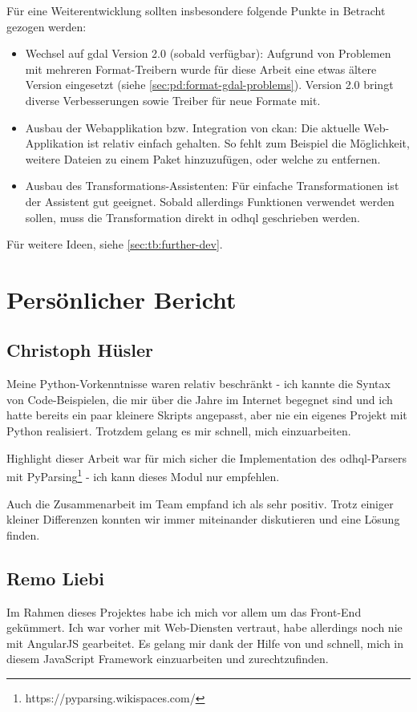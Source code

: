 Für eine Weiterentwicklung sollten insbesondere folgende Punkte in Betracht gezogen werden:

\begin{itemize}
\item Wechsel auf \acs{gdal} Version 2.0 (sobald verfügbar): Aufgrund von Problemen mit mehreren Format-Treibern wurde für diese Arbeit eine etwas ältere Version eingesetzt (siehe \vref{sec:pd:format-gdal-problems}). Version 2.0 bringt diverse Verbesserungen sowie Treiber für neue Formate mit.
\item Ausbau der Webapplikation bzw. Integration von \gls{ckan}: Die aktuelle Web-Applikation ist relativ einfach gehalten. So fehlt zum Beispiel die Möglichkeit, weitere Dateien zu einem Paket hinzuzufügen, oder welche zu entfernen.
\item Ausbau des Transformations-Assistenten: Für einfache Transformationen ist der Assistent gut geeignet. Sobald allerdings Funktionen verwendet werden sollen, muss die Transformation direkt in \acs{odhql} geschrieben werden.
\end{itemize}

Für weitere Ideen, siehe \vref{sec:tb:further-dev}.

\section{Persönlicher Bericht}

\subsection{Christoph Hüsler}
Meine Python-Vorkenntnisse waren relativ beschränkt - ich kannte die Syntax von Code-Beispielen, die mir über die Jahre im Internet begegnet sind und ich hatte bereits ein paar kleinere Skripts angepasst, aber nie ein eigenes Projekt mit Python realisiert. Trotzdem gelang es mir schnell, mich einzuarbeiten.

Highlight dieser Arbeit war für mich sicher die Implementation des \acs{odhql}-Parsers mit PyParsing\footnote{https://pyparsing.wikispaces.com/} - ich kann dieses Modul nur empfehlen. 

Auch die Zusammenarbeit im Team empfand ich als sehr positiv. Trotz einiger kleiner Differenzen konnten wir immer miteinander diskutieren und eine Lösung finden. 

\subsection{Remo Liebi}
Im Rahmen dieses Projektes habe ich mich vor allem um das Front-End gekümmert. Ich war vorher mit Web-Diensten vertraut, habe allerdings noch nie mit AngularJS gearbeitet. Es gelang mir dank der Hilfe von \fscf und \chuf schnell, mich in diesem JavaScript Framework einzuarbeiten und zurechtzufinden.

